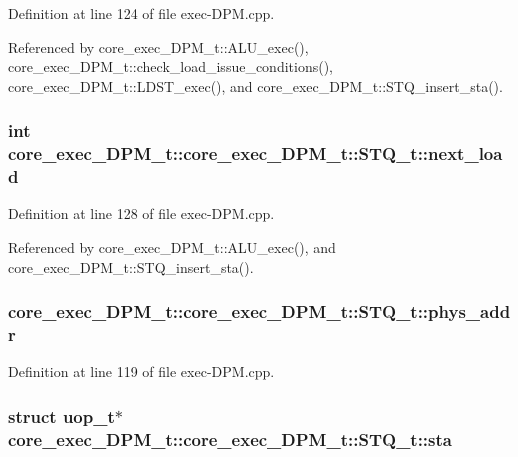 Definition at line 124 of file exec-DPM.cpp.

Referenced by core\_\-exec\_\-DPM\_\-t::ALU\_\-exec(), core\_\-exec\_\-DPM\_\-t::check\_\-load\_\-issue\_\-conditions(), core\_\-exec\_\-DPM\_\-t::LDST\_\-exec(), and core\_\-exec\_\-DPM\_\-t::STQ\_\-insert\_\-sta().
\subsubsection[{next\_\-load}]{\setlength{\rightskip}{0pt plus 5cm}int core\_\-exec\_\-DPM\_\-t::core\_\-exec\_\-DPM\_\-t::STQ\_\-t::next\_\-load}\label{structcore__exec__DPM__t_1_1STQ__t_10592474b3cce4f112cd6c4e8a4bd4b0}




Definition at line 128 of file exec-DPM.cpp.

Referenced by core\_\-exec\_\-DPM\_\-t::ALU\_\-exec(), and core\_\-exec\_\-DPM\_\-t::STQ\_\-insert\_\-sta().
\subsubsection[{phys\_\-addr}]{ core\_\-exec\_\-DPM\_\-t::core\_\-exec\_\-DPM\_\-t::STQ\_\-t::phys\_\-addr}\label{structcore__exec__DPM__t_1_1STQ__t_d66e6e08df9aa85a0798a2532e463bcb}




Definition at line 119 of file exec-DPM.cpp.
\subsubsection[{sta}]{\setlength{\rightskip}{0pt plus 5cm}struct {\bf uop\_\-t}$\ast$ core\_\-exec\_\-DPM\_\-t::core\_\-exec\_\-DPM\_\-t::STQ\_\-t::sta\hspace{0.3cm}{\tt  [read]}}\label{structcore__exec__DPM__t_1_1STQ__t_fea78f479facb83c6ecdc231e2297960}




